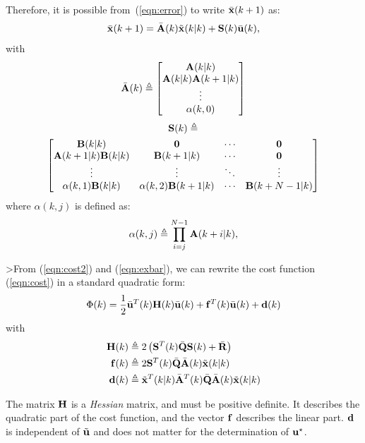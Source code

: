\documentclass[conference]{IEEEtran} %
\begin{document}
Therefore, it is possible from~(\ref{eqn:error}) to write $\bar{\bf x}(k+1)$ as:
\begin{equation}\label{eqn:exbar}
	\bar{\bf x}(k+1) = \bar{\bf A}(k)\tilde{\bf x}(k|k)+{\bf S}(k)\bar{\bf u}(k),
\end{equation}
with
\begin{equation*}
	\bar{\bf A}(k) \triangleq \begin{bmatrix}
		{\bf A}(k|k) \\ {\bf A}(k|k){\bf A}(k+1|k) \\ \vdots \\ \alpha(k,0)
	\end{bmatrix}
\end{equation*}
{\small
\begin{multline*}
		{\bf S}(k) \triangleq \\ \begin{bmatrix}
			{\bf B}(k|k)		       & {\bf 0} 			    	 & \cdots & {\bf 0}         \\
			{\bf A}(k+1|k){\bf B}(k|k) & {\bf B}(k+1|k)      	 & \cdots & {\bf 0}         \\
			\vdots			       & \vdots				 & \ddots & \vdots          \\
			\alpha(k,1){\bf B}(k|k)    & \alpha(k,2){\bf B}(k+1|k) & \cdots & {\bf B}(k+N-1|k)
		\end{bmatrix}
\end{multline*}
}
where  $\alpha(k,j)$ is defined as:
\begin{equation*}
	\alpha(k,j) \triangleq \prod_{i=j}^{N-1}{\bf A}(k+i|k),
\end{equation*}

>From (\ref{eqn:cost2}) and (\ref{eqn:exbar}), we can rewrite the cost function (\ref{eqn:cost}) in a standard quadratic form:
\begin{equation*}
	\Phi(k) = \frac{1}{2}\bar{\bf u}^T(k){\bf H}(k)\bar{\bf u}(k) + {\bf f}^T(k)\bar{\bf u}(k) + {\bf d}(k)
\end{equation*}
with
\begin{align*}
	{\bf H}(k) &\triangleq 2\left({\bf S}^T(k)\bar{\bf Q}{\bf S}(k)+\bar{\bf R}\right) \\
	{\bf f}(k) &\triangleq 2{\bf S}^T(k)\bar{\bf Q}\bar{\bf A}(k)\tilde{\bf x}(k|k) \\
	{\bf d}(k) &\triangleq \tilde{\bf x}^T(k|k)\bar{\bf A}^T(k)\bar{\bf Q}\bar{\bf A}(k)\tilde{\bf x}(k|k)
\end{align*}

The matrix ${\bf H}$ is a {\em Hessian} matrix, and must be positive
definite. It describes the quadratic part of the cost function, and the
vector ${\bf f}$ describes the linear part. $\bf d$ is independent of
$\tilde{\bf u}$ and does not matter for the determination of $\bf u^\star$.
\end{document}
